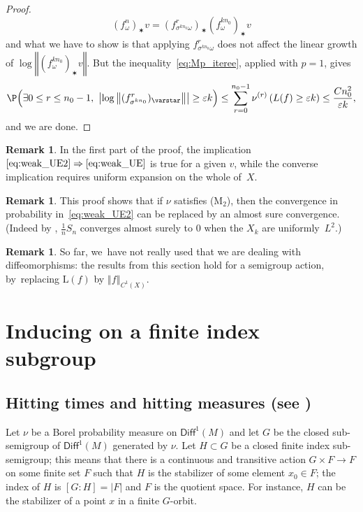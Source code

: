 \documentclass[JEP,XML,SOM,Unicode,published]{cedram}
\let\e\varepsilon
\newcommand{\norm}[1]{{\left\Vert#1\right\Vert}}
\newcommand{\abs}[1]{\left\vert#1\right\vert}
\newcommand{\lrpar}[1]{\left(#1\right)}
\newcommand{\Blrpar}[1]{\Bigl(#1\Bigr)}
\newcommand\Diff{{\mathsf{Diff}}}
\theoremstyle{plain}
\theoremstyle{definition}
\newtheorem{rem}[thm]{Remark}
\begin{document}
\begin{proof}
\begin{equation*}\label{eq:differential}
{(f^{n }_\omega)_\varstar v} = (f^{r}_{\sigma^{kn_0} \omega})_\varstar
(f^{kn_0}_\omega)_\varstar v
\end{equation*}
and what we have to show is that applying $f^{r}_{\sigma^{kn_0} \omega}$
does not affect
the linear growth of $ \log\norm{ (f^{kn_0}_\omega)_\varstar v }$.
But the inequality~\eqref{eq:Mp_iteree}, applied with $p=1$, gives
\begin{equation*}
\P \Blrpar{\exists 0\leq r\leq n_0-1, \ \abs{\log\norm{ ( f^{r}_{\sigma^{kn_0}})_\varstar }}\geq \e k}
\leq \sum_{r=0}^{n_0-1}
\nu^{(r)}\lrpar{ L(f) \geq \e k}
\leq \frac{Cn_0^2}{\e k} ,
\end{equation*}
and we are done.
\end{proof}

\begin{rem} \label{rem:given_v} In the first part of the proof,
the implication~$\eqref{eq:weak_UE2}\Rightarrow\eqref{eq:weak_UE}$ is true for a given $v$, while the converse implication requires uniform expansion on the whole of~$X$.
\end{rem}

\begin{rem}
This proof shows that if $\nu$ satisfies (M$_2$), then the convergence in probability in~\eqref{eq:weak_UE2} can be replaced by an almost sure convergence. (Indeed by \cite[Th.\,3, p.\,243]{Feller:vol2},
$\frac{1}{n}S_n$ converges almost surely to $0$ when the $X_k$ are uniformly~$L^2$.)
\end{rem}

\begin{rem}
So far, we~have not really used that we are dealing with diffeomorphisms: the results from this section
hold for a semigroup action, by~replacing $\mathrm L(f)$ by $\norm{f}_{C^1(X)}$.
\end{rem}

\section{Inducing on a finite index subgroup} \label{sec:inducing}

\subsection{Hitting times and hitting measures (see \cite[Chap.\,5]{benoist-quint_book}) }\label{par:hitting_measure}

Let $\nu$ be a Borel
probability measure on $\Diff^1(M)$ and let $G$ be the
closed sub-semigroup of $\Diff^1(M)$ generated by $\nu$.
Let $H\subset G$ be a closed finite index
sub-semigroup; this means that
there is a continuous and transitive action $G\times F \to F$ on some finite set $F$ such that $H$ is the stabilizer of some element $x_0\in F$; the index of
$H$ is $[G:H]=\abs{F}$ and $F$ is the quotient space.
For instance, $H$ can be the stabilizer of a point $x$ in a finite $G$-orbit.
\end{document}
